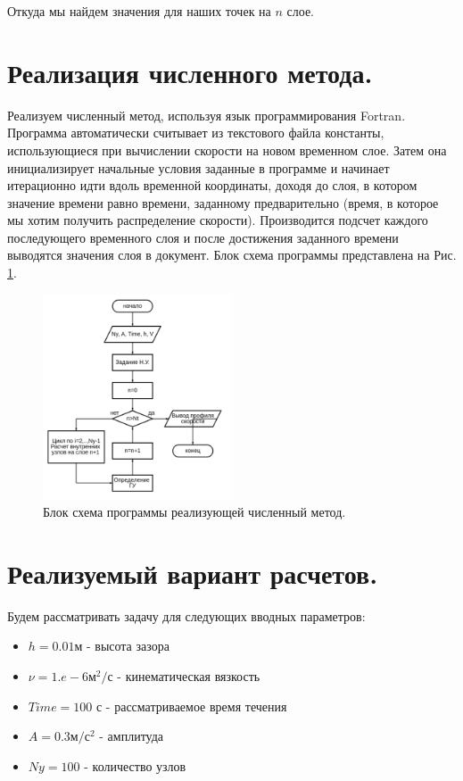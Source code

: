 Откуда мы найдем значения для наших точек на $n$ слое.


\section{Реализация численного метода.}
Реализуем численный метод, используя язык программирования Fortran. Программа автоматически считывает из текстового файла константы, использующиеся при вычислении скорости на новом временном слое.
Затем она инициализирует начальные условия заданные в программе и начинает итерационно идти вдоль временной координаты, доходя до слоя, в котором значение времени равно времени, заданному предварительно (время, в которое мы хотим получить распределение скорости).
Производится подсчет каждого последующего временного слоя и после достижения заданного времени выводятся значения слоя в документ. Блок схема программы представлена на Рис. \ref{fig:4}.

\begin{figure}[H]
    \centering
    \includegraphics[width=0.5\textwidth]{images/4.png}
    \caption {Блок схема программы реализующей численный метод.}
    \label{fig:4}
\end{figure}

\section{Реализуемый вариант расчетов.}
Будем рассматривать задачу для следующих вводных параметров:
\begin{itemize}
    \item $h=0.01$м - высота зазора
    \item $\nu = 1.e-6 \text{м}^2/\text{с}$  - кинематическая вязкость
    \item $Time = 100$ с - рассматриваемое время течения
    \item $A=0.3 \text{м}/\text{с}^2$ - амплитуда
    \item $Ny = 100$ - количество узлов
\end{itemize}

